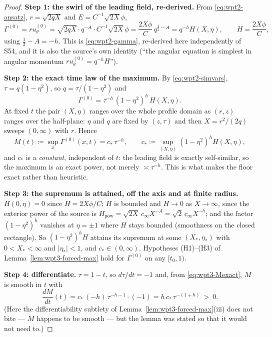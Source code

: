 \documentclass[11pt]{article}
\theoremstyle{definition}
\theoremstyle{remark}
\newcommand{\abs}[1]{\left|#1\right|}
\begin{document}
\begin{proof}
  \textbf{Step 1: the swirl of the leading field, re-derived.} From
  \eqref{eq:wpt2-ansatz}, $r=\sqrt{2qX}$ and $E=C^{-1}\sqrt{2X}\phi$,
  \[
    \Gamma^{(0)}=ru^{(0)}_\theta
      =\sqrt{2qX}\cdot q^{-A}\cdot C^{-1}\sqrt{2X}\phi
      =\frac{2X\phi}{C}\,q^{\frac12-A}
      =q^{-h}H(X,\eta),\qquad H=\frac{2X\phi}{C},
  \]
  using $\tfrac12-A=-h$. This is \eqref{eq:wpt2-gamma}, re-derived here
  independently of S54, and it is also the source's own identity (``the
  angular equation is simplest in angular momentum
  $ru_\theta^{(0)}=q^{-h}H$'').

  \textbf{Step 2: the exact time law of the maximum.} By
  \eqref{eq:wpt2-simvars}, $\tau=q(1-\eta^2)$, so $q=\tau/(1-\eta^2)$ and
  \[
    \Gamma^{(0)}=\tau^{-h}\,(1-\eta^2)^{h}\,H(X,\eta).
  \]
  At fixed $t$ the pair $(X,\eta)$ ranges over the whole profile domain as
  $(r,z)$ ranges over the half-plane: $\eta$ and $q$ are fixed by $(z,\tau)$
  and then $X=r^2/(2q)$ sweeps $(0,\infty)$ with $r$. Hence
  \begin{equation}\label{eq:wpt3-Mexact}
    M(t)\coloneqq\sup_x\Gamma^{(0)}(x,t)=c_*\,\tau^{-h},
    \qquad
    c_*\coloneqq\sup_{(X,\eta)}(1-\eta^2)^{h}H(X,\eta),
  \end{equation}
  and $c_*$ is a \emph{constant}, independent of $t$: the leading field is
  exactly self-similar, so the maximum is an exact power, not merely
  $\asymp\tau^{-h}$. This is what makes the floor exact rather than
  heuristic.

  \textbf{Step 3: the supremum is attained, off the axis and at finite
  radius.} $H(0,\eta)=0$ since $H=2X\phi/C$; $H$ is bounded and
  $H\to0$ as $X\to\infty$, since the exterior power of the source is
  $H_{\mathrm{pow}}=\sqrt{2X}\,c_\infty X^{-A}=\sqrt2\,c_\infty X^{-h}$; and
  the factor $(1-\eta^2)^h$ vanishes at $\eta=\pm1$ where $H$ stays bounded
  (smoothness on the closed rectangle). So $(1-\eta^2)^hH$ attains its
  supremum at some $(X_*,\eta_*)$ with $0<X_*<\infty$ and $\abs{\eta_*}<1$,
  and $c_*\in(0,\infty)$. Hypotheses (H1)--(H3) of
  Lemma~\ref{lem:wpt3-forced-max} hold for $\Gamma^{(0)}$ on any
  $[t_0,1)$.

  \textbf{Step 4: differentiate.} $\tau=1-t$, so $d\tau/dt=-1$ and, from
  \eqref{eq:wpt3-Mexact}, $M$ is smooth in $t$ with
  \begin{equation}\label{eq:wpt3-Mdot}
    \frac{dM}{dt}(t)=c_*\,(-h)\,\tau^{-h-1}\cdot(-1)
      =h\,c_*\,\tau^{-(1+h)}\ >\ 0 .
  \end{equation}
  (Here the differentiability subtlety of
  Lemma~\ref{lem:wpt3-forced-max}(iii) does not bite --- $M$ happens to be
  smooth --- but the lemma was stated so that it would not need to.)


\end{proof}
\end{document}
